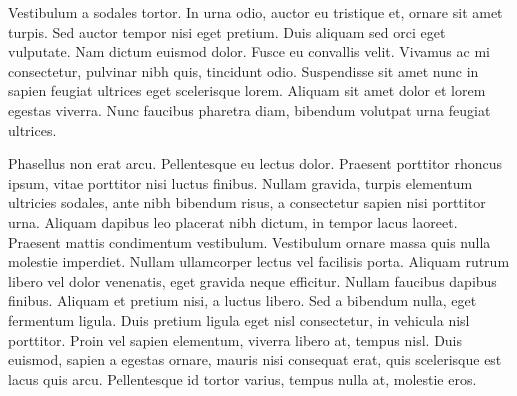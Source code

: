 Vestibulum a sodales tortor. In urna odio, auctor eu tristique et, ornare sit amet turpis. Sed auctor tempor nisi eget pretium. Duis aliquam sed orci eget vulputate. Nam dictum euismod dolor. Fusce eu convallis velit. Vivamus ac mi consectetur, pulvinar nibh quis, tincidunt odio. Suspendisse sit amet nunc in sapien feugiat ultrices eget scelerisque lorem. Aliquam sit amet dolor et lorem egestas viverra. Nunc faucibus pharetra diam, bibendum volutpat urna feugiat ultrices.

Phasellus non erat arcu. Pellentesque eu lectus dolor. Praesent porttitor rhoncus ipsum, vitae porttitor nisi luctus finibus. Nullam gravida, turpis elementum ultricies sodales, ante nibh bibendum risus, a consectetur sapien nisi porttitor urna. Aliquam dapibus leo placerat nibh dictum, in tempor lacus laoreet. Praesent mattis condimentum vestibulum. Vestibulum ornare massa quis nulla molestie imperdiet. Nullam ullamcorper lectus vel facilisis porta. Aliquam rutrum libero vel dolor venenatis, eget gravida neque efficitur. Nullam faucibus dapibus finibus. Aliquam et pretium nisi, a luctus libero. Sed a bibendum nulla, eget fermentum ligula. Duis pretium ligula eget nisl consectetur, in vehicula nisl porttitor. Proin vel sapien elementum, viverra libero at, tempus nisl. Duis euismod, sapien a egestas ornare, mauris nisi consequat erat, quis scelerisque est lacus quis arcu. Pellentesque id tortor varius, tempus nulla at, molestie eros.